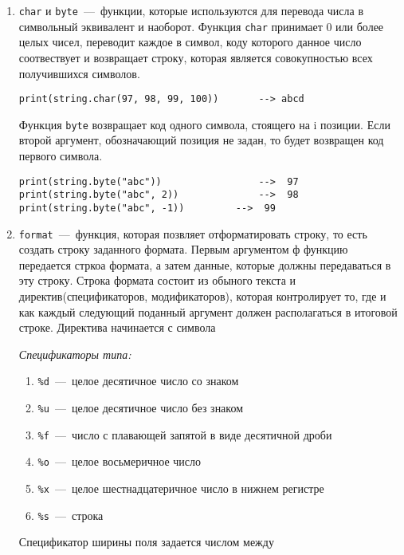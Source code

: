 \begin{enumerate}
	\item \lstinline{char} и \lstinline{byte}~---~функции, которые используются для перевода числа в символьный эквивалент и наоборот.
	 Функция \lstinline{char} принимает 0 или более целых чисел, переводит каждое в символ, коду которого данное число соотвествует и возвращает строку, которая является совокупностью всех получившихся символов. 
	
\begin{lstlisting}
print(string.char(97, 98, 99, 100))       --> abcd
\end{lstlisting} 

	Функция \lstinline{byte} возвращает код одного символа, стоящего на i позиции. Если второй аргумент, обозначающий позиция не задан, то будет возвращен код первого символа. 
	
\begin{lstlisting}
print(string.byte("abc"))                 -->  97
print(string.byte("abc", 2))              -->  98
print(string.byte("abc", -1))     	  -->  99
\end{lstlisting}
	
	\item \lstinline{format}~---~функция, которая позвляет отформатировать строку, то есть создать строку заданного формата. Первым аргументом ф функцию передается стркоа формата, а затем данные, которые должны передаваться в эту строку. Строка формата состоит из обыного текста и директив(спецификаторов, модификаторов), которая контролирует то, где и как каждый следующий поданный аргумент должен располагаться в итоговой строке. Директива начинается с символа %

\emph{Спецификаторы типа:}
\begin{enumerate}
	\item \lstinline{%d}~---~целое десятичное число со знаком
	\item \lstinline{%u}~---~целое десятичное число без знаком
	\item \lstinline{%f}~---~число с плавающей запятой в виде десятичной дроби
	\item \lstinline{%o}~---~целое восьмеричное число
	\item \lstinline{%x}~---~целое шестнадцатеричное число в нижнем регистре
	\item \lstinline{%s}~---~строка
\end{enumerate}

Спецификатор ширины поля задается числом между %


\end{enumerate}
